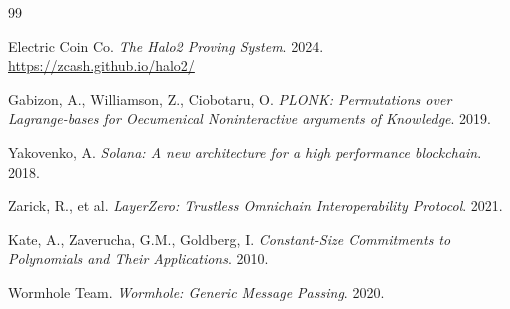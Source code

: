 \documentclass[11pt,a4paper]{article}
\begin{document}
\newpage

\begin{thebibliography}{99}

Electric Coin Co. \textit{The Halo2 Proving System}. 2024. \url{https://zcash.github.io/halo2/}

Gabizon, A., Williamson, Z., Ciobotaru, O. \textit{PLONK: Permutations over Lagrange-bases for Oecumenical Noninteractive arguments of Knowledge}. 2019.

Yakovenko, A. \textit{Solana: A new architecture for a high performance blockchain}. 2018.

Zarick, R., et al. \textit{LayerZero: Trustless Omnichain Interoperability Protocol}. 2021.

Kate, A., Zaverucha, G.M., Goldberg, I. \textit{Constant-Size Commitments to Polynomials and Their Applications}. 2010.

Wormhole Team. \textit{Wormhole: Generic Message Passing}. 2020.

\end{thebibliography}
\end{document}
